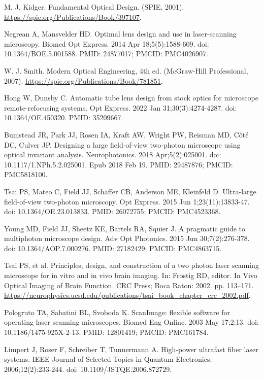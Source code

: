 \documentclass[10pt,letterpaper]{article}
\begin{document}
\begin{thebibliography}{10}
M. J. Kidger. Fundamental Optical Design. (SPIE, 2001). \url{https://spie.org/Publications/Book/397107}.

Negrean A, Mansvelder HD. Optimal lens design and use in laser-scanning microscopy. Biomed Opt Express. 2014 Apr 18;5(5):1588-609. doi: 10.1364/BOE.5.001588. PMID: 24877017; PMCID: PMC4026907.

W. J. Smith. Modern Optical Engineering, 4th ed. (McGraw-Hill Professional, 2007). \url{https://spie.org/Publications/Book/781851}.

Hong W, Dunsby C. Automatic tube lens design from stock optics for microscope remote-refocusing systems. Opt Express. 2022 Jan 31;30(3):4274-4287. doi: 10.1364/OE.450320. PMID: 35209667.

Bumstead JR, Park JJ, Rosen IA, Kraft AW, Wright PW, Reisman MD, Côté DC, Culver JP. Designing a large field-of-view two-photon microscope using optical invariant analysis. Neurophotonics. 2018 Apr;5(2):025001. doi: 10.1117/1.NPh.5.2.025001. Epub 2018 Feb 19. PMID: 29487876; PMCID: PMC5818100.

Tsai PS, Mateo C, Field JJ, Schaffer CB, Anderson ME, Kleinfeld D. Ultra-large field-of-view two-photon microscopy. Opt Express. 2015 Jun 1;23(11):13833-47. doi: 10.1364/OE.23.013833. PMID: 26072755; PMCID: PMC4523368.

Young MD, Field JJ, Sheetz KE, Bartels RA, Squier J. A pragmatic guide to multiphoton microscope design. Adv Opt Photonics. 2015 Jun 30;7(2):276-378. doi: 10.1364/AOP.7.000276. PMID: 27182429; PMCID: PMC4863715.

Tsai PS, et al. Principles, design, and construction of a two photon laser scanning microscope for in vitro and in vivo brain imaging. In: Frostig RD, editor. In Vivo Optical Imaging of Brain Function. CRC Press; Boca Raton: 2002. pp. 113–171. \url{https://neurophysics.ucsd.edu/publications/tsai_book_chapter_crc_2002.pdf}.

Pologruto TA, Sabatini BL, Svoboda K. ScanImage: flexible software for operating laser scanning microscopes. Biomed Eng Online. 2003 May 17;2:13. doi: 10.1186/1475-925X-2-13. PMID: 12801419; PMCID: PMC161784.

Limpert J, Roser F, Schreiber T, Tunnermann A. High-power ultrafast fiber laser systems. IEEE Journal of Selected Topics in Quantum Electronics. 2006;12(2):233-244. doi: 10.1109/JSTQE.2006.872729.


\end{thebibliography}
\end{document}
